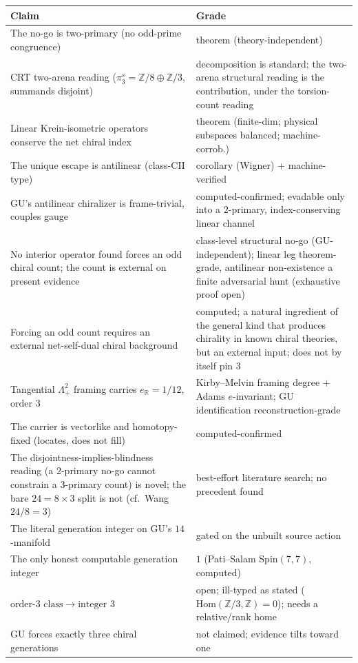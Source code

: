\documentclass[11pt]{article}
\theoremstyle{definition}
\theoremstyle{remark}
\newcommand{\Z}{\mathbb{Z}}
\newcommand{\R}{\mathbb{R}}
\newcommand{\pis}{\pi_3^{s}}
\newcommand{\Spin}{\mathrm{Spin}}
\newcommand{\Hom}{\mathrm{Hom}}
\newcommand{\Lamp}{\Lambda^2_{+}}
\newcommand{\eR}{e_{\R}}
\begin{document}
\begin{longtable}{p{} p{}}
\toprule
\textbf{Claim} & \textbf{Grade} \\
\midrule
\endhead
The no-go is two-primary (no odd-prime congruence) & theorem (theory-independent) \\
CRT two-arena reading ($\pis = \Z/8\oplus\Z/3$, summands disjoint) & decomposition is standard; the two-arena structural reading is the contribution, under the torsion-count reading \\
Linear Krein-isometric operators conserve the net chiral index & theorem (finite-dim; physical subspaces balanced; machine-corrob.) \\
The unique escape is antilinear (class-CII type) & corollary (Wigner) + machine-verified \\
GU's antilinear chiralizer is frame-trivial, couples gauge & computed-confirmed; evadable only into a $2$-primary, index-conserving linear channel \\
No interior operator found forces an odd chiral count; the count is external on present evidence & class-level structural no-go (GU-independent); linear leg theorem-grade, antilinear non-existence a finite adversarial hunt (exhaustive proof open) \\
Forcing an odd count requires an external net-self-dual chiral background & computed; a natural ingredient of the general kind that produces chirality in known chiral theories, but an external input; does not by itself pin $3$ \\
Tangential $\Lamp$ framing carries $\eR=1/12$, order $3$ & Kirby--Melvin framing degree $+$ Adams $e$-invariant; GU identification reconstruction-grade \\
The carrier is vectorlike and homotopy-fixed (locates, does not fill) & computed-confirmed \\
The disjointness-implies-blindness reading (a $2$-primary no-go cannot constrain a $3$-primary count) is novel; the bare $24 = 8\times 3$ split is not (cf.\ Wang $24/8=3$) & best-effort literature search; no precedent found \\
The literal generation integer on GU's $14$-manifold & gated on the unbuilt source action \\
The only honest computable generation integer & $1$ (Pati--Salam $\Spin(7,7)$, computed) \\
$\text{order-}3\text{ class}\to\text{integer }3$ & open; ill-typed as stated ($\Hom(\Z/3,\Z)=0$); needs a relative/rank home \\
GU forces exactly three chiral generations & not claimed; evidence tilts toward one \\
\bottomrule
\end{longtable}
\end{document}
